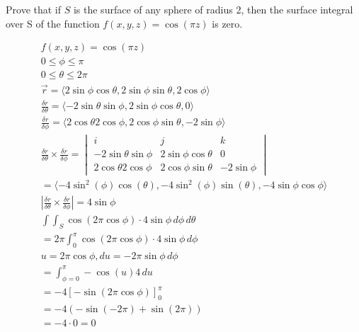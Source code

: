 \documentclass[12pt]{exam}
\begin{document}
\begin{questions}
\question Prove that if $S$ is the surface of any sphere of radius 2, then the surface integral over S of the function $f (x, y, z) = \cos(\pi z)$ is zero.
    \begin{solution}
        \begin{gather*}
            f(x, y, z) = \cos(\pi z)\\
            0 \leq \phi \leq \pi\\
            0 \leq \theta \leq 2\pi \\
            \overrightarrow{r} = \langle 2\sin\phi\cos\theta, 2\sin\phi\sin\theta, 2\cos\phi \rangle \\
            \frac{\delta r}{\delta \theta} = \langle -2\sin\theta \sin \phi, 2 \sin \phi \cos \theta, 0 \rangle \\
            \frac{\delta r}{\delta \phi} = \langle 2 \cos \theta 2 \cos \phi, 2\cos \phi \sin \theta, - 2 \sin \phi \rangle \\
            \frac{\delta r}{\delta \theta} \times \frac{\delta r}{\delta \phi} = \begin{vmatrix}
                i & j & k \\
                -2\sin\theta \sin \phi & 2 \sin \phi \cos \theta & 0 \\
                2 \cos \theta 2 \cos \phi & 2\cos \phi \sin \theta & - 2 \sin \phi
            \end{vmatrix} \\ 
            = \langle -4 \sin^2 (\phi) \cos (\theta), -4 \sin^2(\phi) \sin(\theta), -4 \sin\phi\cos\phi \rangle \\
            \left| \frac{\delta r}{\delta \theta} \times \frac{\delta r}{\delta \phi} \right| = 4\sin\phi \\
            \int\int_S \cos(2\pi \cos \phi) \cdot 4 \sin \phi \,d\phi \,d\theta\\
            = 2\pi \int_{0}^{\pi} \cos(2\pi\cos\phi)\cdot 4\sin\phi\,d\phi \\
            u = 2\pi \cos \phi, du = -2\pi \sin\phi \,d\phi \\
            = \int_{\phi = 0}^{\pi} -\cos(u)4\,du \\
            = -4 \left[-\sin(2\pi\cos\phi) \right]_0^\pi \\
            = -4 (-\sin(-2\pi) + \sin(2\pi)) \\
            = -4 \cdot 0 = \boxed{0}
        \end{gather*}
    \end{solution}
\clearpage


\end{questions}
\end{document}

